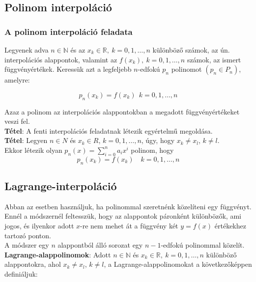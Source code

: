 \documentclass[tikz,12pt,margin=0px]{article}
\begin{document}
	\subsection*{Polinom interpoláció}
	
	\subsubsection*{A polinom interpoláció feladata}
	Legyenek adva $n \in \mathbb{N}$ és az $x_{k} \in \mathbb{R},\ k=0,1,\ldots,n$ különböző számok, az ún. interpolációs alappontok, valamint
	az $f(x_{k}),\ k=0,1,\ldots,n$ számok, az ismert függvényértékek. Keressük azt a legfeljebb $n$-edfokú $p_{n}$ polinomot $(p_{n} \in P_{n})$,
	amelyre:
	
	\begin{displaymath}
		p_{n}(x_{k}) = f(x_{k}) \ \ k=0,1,\ldots,n
	\end{displaymath}
	
	\noindent Azaz a polinom az interpolációs alappontokban a megadott függvényértékeket veszi fel.\\
	
	\noindent \textbf{Tétel}: A fenti interpolációs feladatnak létezik egyértelmű megoldása.\\

    \noindent \textbf{Tétel}: Legyen $n \in N$ és $x_{k} \in R$, $k = 0, 1, \ldots, n$, úgy, hogy $x_{k} \neq x_{l}$, $k \neq l$.\\
    Ekkor létezik olyan $p_{n}(x) = \sum\limits_{i=0}^{n}a_{i}x^{i}$ polinom, hogy
    \[
        p_{n}(x_{k}) = f(x_{k}) \quad k = 0, 1, \ldots, n
    \]
	
	\subsection*{Lagrange-interpoláció}
    Abban az esetben használjuk, ha polinommal szeretnénk közelíteni egy függvényt.  Ennél a módszernél feltesszük, hogy az alappontok páronként különbözők, ami jogos, és ilyenkor adott $x$-re nem mehet át a függvény két $y=f(x)$ értékekhez tartozó ponton. \\
    
    \noindent A módszer egy $n$ alappontból álló sorozat egy $n-1$-edfokú polinommal közelít.\\
    
	\noindent \textbf{Lagrange-alappolinomok}: Adott $n \in \mathbb{N}$ és $x_{k} \in \mathbb{R},\ k=0,1,\ldots,n$ különböző alappontokra, ahol $x_{k} \neq x_{l}$, $k \neq l$,
	a Lagrange-alappolinomokat a következőképpen definiáljuk:
	
\end{document}
